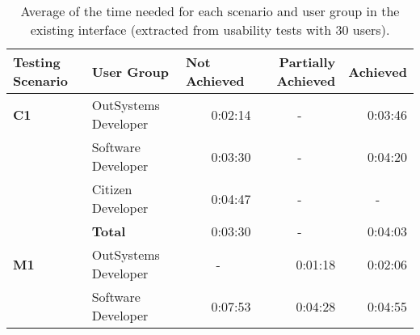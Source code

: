 \begin{table}[tb]
  \caption{Average of the time needed for each scenario and user group in the existing interface (extracted from usability tests with 30 users).}
    \label{tab:duration_existing_interface}
  \begin{tabular}{llrrr}
  \hline
  \rowcolor[HTML]{EFEFEF} 
  \textbf{Testing Scenario} & \textbf{User Group}  & \multicolumn{1}{l}{\cellcolor[HTML]{EFEFEF}\textbf{Not Achieved}} & \multicolumn{1}{C{2cm}}{\cellcolor[HTML]{EFEFEF}\textbf{Partially Achieved}} & \multicolumn{1}{l}{\cellcolor[HTML]{EFEFEF}\textbf{Achieved}} \\ \hline
  \textbf{C1}               & OutSystems Developer & 0:02:14                                                           & \multicolumn{1}{c}{-}                                                   & 0:03:46                                                       \\
                            & Software Developer   & 0:03:30                                                           & \multicolumn{1}{c}{-}                                                   & 0:04:20                                                       \\
                            & Citizen Developer    & 0:04:47                                                           & \multicolumn{1}{c}{-}                                                   & \multicolumn{1}{c}{-}                                         \\
                            & \textbf{Total}       & 0:03:30                                                           & \multicolumn{1}{c}{-}                                                   & 0:04:03                                                       \\ \hline
  \textbf{M1}               & OutSystems Developer & \multicolumn{1}{c}{-}                                             & 0:01:18                                                                 & 0:02:06                                                       \\
                            & Software Developer   & 0:07:53                                                           & 0:04:28                                                                 & 0:04:55                                                       \\

\end{tabular}
\end{table}
